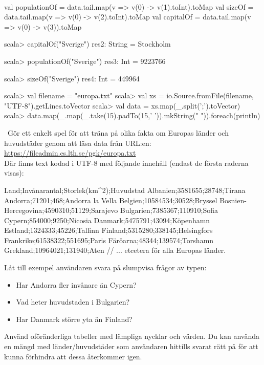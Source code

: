 \TaskSolved \what~

\SubtaskSolved
\begin{CodeSmall}
val populationOf = data.tail.map(v => v(0) -> v(1).toInt).toMap
val sizeOf       = data.tail.map(v => v(0) -> v(2).toInt).toMap
val capitalOf    = data.tail.map(v => v(0) -> v(3)).toMap
\end{CodeSmall}

\begin{REPL}
scala> capitalOf("Sverige")
res2: String = Stockholm

scala> populationOf("Sverige")
res3: Int = 9223766

scala> sizeOf("Sverige")
res4: Int = 449964
\end{REPL}

\begin{REPL}
scala> val filename = "europa.txt"
scala> val xs = io.Source.fromFile(filename, "UTF-8").getLines.toVector
scala> val data = xs.map(_.split(';').toVector)
scala> data.map(_.map(_.take(15).padTo(15,' ')).mkString(" ")).foreach(println)
\end{REPL}
\QUESTEND





\ExtraTasks %


\QUESTBEGIN

\Task \what~Gör ett enkelt spel för att träna på olika fakta om Europas länder och huvudstäder genom att läsa data från URL:en:\\ \url{https://fileadmin.cs.lth.se/pgk/europa.txt}
\\Där finns text kodad i UTF-8 med följande innehåll (endast de första raderna visas):
\begin{Code}
Land;Invånarantal;Storlek(km^2);Huvudstad
Albanien;3581655;28748;Tirana
Andorra;71201;468;Andorra la Vella
Belgien;10584534;30528;Bryssel
Bosnien-Hercegovina;4590310;51129;Sarajevo
Bulgarien;7385367;110910;Sofia
Cypern;854000;9250;Nicosia
Danmark;5475791;43094;Köpenhamn
Estland;1324333;45226;Tallinn
Finland;5315280;338145;Helsingfors
Frankrike;61538322;551695;Paris
Färöarna;48344;139574;Torshamn
Grekland;10964021;131940;Aten
// ... etcetera för alla Europas länder.
\end{Code}
Låt till exempel användaren svara på slumpvisa frågor av typen:
\begin{itemize}[noitemsep]
  \item Har Andorra fler invånare än Cypern?
  \item Vad heter huvudstaden i Bulgarien?
  \item Har Danmark större yta än Finland?
\end{itemize}
Använd oföränderliga tabeller med lämpliga nycklar och värden. Du kan använda en mängd med länder/huvudstäder som användaren hittills svarat rätt på för att kunna förhindra att dessa återkommer igen.
\SOLUTION

